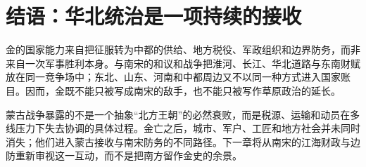 \section{结语：华北统治是一项持续的接收}

金的国家能力来自把征服转为中都的供给、地方税役、军政组织和边界防务，而非来自一次军事胜利本身。与南宋的和议和战争把淮河、长江、华北道路与东南财赋放在同一竞争场中；东北、山东、河南和中都周边又不以同一种方式进入国家账目。因而，金既不能只被写成南宋的敌手，也不能只被写作草原政治的延长。

蒙古战争暴露的不是一个抽象“北方王朝”的必然衰败，而是税源、运输和动员在多线压力下失去协调的具体过程。金亡之后，城市、军户、工匠和地方社会并未同时消失；他们进入蒙古接收与南宋防务的不同路径。下一章将从南宋的江海财政与边防重新审视这一互动，而不是把南方留作金史的余景。
